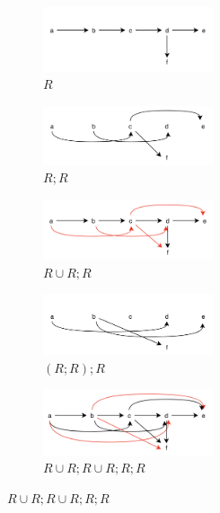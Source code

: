 \begin{figure}[h!]
    \centering
    \begin{subfigure}{.3\textwidth}
        \centering
        \includegraphics[width=5cm]{images/chiusura-transitiva-1.png}
        \caption{$R$}
    \end{subfigure}
    \hfill
    \begin{subfigure}{.3\textwidth}
        \centering
        \includegraphics[width=5cm]{images/chiusura-transitiva-2.png}
        \caption{$R;R$}
    \end{subfigure}
    \hfill
    \begin{subfigure}{.3\textwidth}
        \centering
        \includegraphics[width=5cm]{images/chiusura-transitiva-3.png}
        \caption{$R \cup R;R$}
    \end{subfigure}
    \hfill
    \begin{subfigure}{.3\textwidth}
        \vspace{15pt}
        \centering
        \includegraphics[width=5cm]{images/chiusura-transitiva-4.png}
        \caption{$(R;R);R$}
    \end{subfigure}
    \hfill
    \begin{subfigure}{.3\textwidth}
        \vspace{15pt}
        \centering
        \includegraphics[width=5cm]{images/chiusura-transitiva-5.png}
        \caption{$R \cup R;R \cup R;R;R$}

\end{subfigure}
\end{figure}
